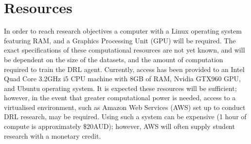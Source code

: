 \section{Resources}
In order to reach research objectives a computer with a Linux operating system featuring RAM, and a Graphics Processing Unit (GPU) will be required. The exact specifications of these computational resources are not yet known, and will be dependent on the size of the datasets, and the amount of computation required to train the DRL agent. Currently, access has been provided to an Intel Quad Core 3.2$\si{\giga\hertz}$ i5 CPU machine with 8GB of RAM, Nvidia GTX960 GPU, and Ubuntu operating system. It is expected these resources will be sufficient; however, in the event that greater computational power is needed, access to a virtualised environment, such as Amazon Web Services (AWS) set up to conduct DRL research, may be required. Using such a system can be expensive (1 hour of compute is approximately \$20AUD); however, AWS will often supply student research with a monetary credit.

%	
%	
